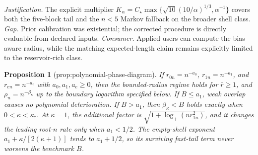 \documentclass{article}
\newtheorem{proposition}{Proposition}
\begin{document}
\par\smallskip\noindent \textit{Justification.} The explicit multiplier \(K_\alpha=C_\star\max\{\sqrt{10}(10/\alpha)^{1/3},\alpha^{-1}\}\) covers both the five-block tail and the \(n<5\) Markov fallback on the broader shell class. \textit{Gap.} Prior calibration was existential; the corrected procedure is directly evaluable from declared inputs. \textit{Consumer.} Applied users can compute the bias-aware radius, while the matching expected-length claim remains explicitly limited to the reservoir-rich class.

\begin{proposition}[prop:polynomial-phase-diagram]\label{prop:polynomial-phase-diagram}
If \(r_{0n}=n^{-a_0}\), \(r_{1n}=n^{-a_1}\), and \(r_{en}=n^{-a_e}\) with \(a_0,a_1,a_e\ge0\), then the bounded-radius regime holds for \(\bar r\ge1\), and \(\rho_n=n^{-\beta_{\kappa}}\) up to the boundary logarithm specified below. If \(B\le a_1\), weak overlap causes no polynomial deterioration. If \(B>a_1\), then \(\beta_{\kappa}<B\) holds exactly when \(0<\kappa<\kappa_{\dagger}\). At \(\kappa=1\), the additional factor is \(\sqrt{1+\log_+(n r_{1n}^2)}\), and it changes the leading root-\(n\) rate only when \(a_1<1/2\). The empty-shell exponent \(a_1+\kappa/[2(\kappa+1)]\) tends to \(a_1+1/2\), so its surviving fast-tail term never worsens the benchmark \(B\).
\end{proposition}
\end{document}
